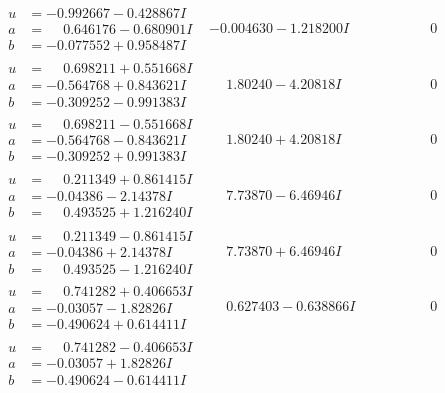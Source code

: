 \documentclass[1p]{elsarticle_modified}
\theoremstyle{definition}
\begin{document}
$$\begin{array}{c|c|c}
\begin{aligned}
u &= -0.992667 - 0.428867 I \\
a &= \phantom{-}0.646176 - 0.680901 I \\
b &= -0.077552 + 0.958487 I\end{aligned}
 & -0.004630 - 1.218200 I & \phantom{-0.000000 } 0 \\ \hline\begin{aligned}
u &= \phantom{-}0.698211 + 0.551668 I \\
a &= -0.564768 + 0.843621 I \\
b &= -0.309252 - 0.991383 I\end{aligned}
 & \phantom{-}1.80240 - 4.20818 I & \phantom{-0.000000 } 0 \\ \hline\begin{aligned}
u &= \phantom{-}0.698211 - 0.551668 I \\
a &= -0.564768 - 0.843621 I \\
b &= -0.309252 + 0.991383 I\end{aligned}
 & \phantom{-}1.80240 + 4.20818 I & \phantom{-0.000000 } 0 \\ \hline\begin{aligned}
u &= \phantom{-}0.211349 + 0.861415 I \\
a &= -0.04386 - 2.14378 I \\
b &= \phantom{-}0.493525 + 1.216240 I\end{aligned}
 & \phantom{-}7.73870 - 6.46946 I & \phantom{-0.000000 } 0 \\ \hline\begin{aligned}
u &= \phantom{-}0.211349 - 0.861415 I \\
a &= -0.04386 + 2.14378 I \\
b &= \phantom{-}0.493525 - 1.216240 I\end{aligned}
 & \phantom{-}7.73870 + 6.46946 I & \phantom{-0.000000 } 0 \\ \hline\begin{aligned}
u &= \phantom{-}0.741282 + 0.406653 I \\
a &= -0.03057 - 1.82826 I \\
b &= -0.490624 + 0.614411 I\end{aligned}
 & \phantom{-}0.627403 - 0.638866 I & \phantom{-0.000000 } 0 \\ \hline\begin{aligned}
u &= \phantom{-}0.741282 - 0.406653 I \\
a &= -0.03057 + 1.82826 I \\
b &= -0.490624 - 0.614411 I\end{aligned}

\end{array}$$
\end{document}
